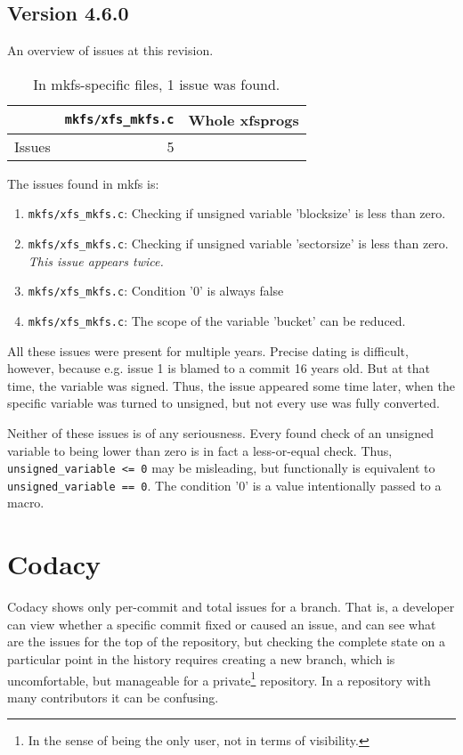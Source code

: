 \subsection{Version 4.6.0}
An overview of issues at this revision.
\begin{table}[h]
\begin{tabular}{|l||r||r|}
\hline
& {\tt mkfs/xfs\_mkfs.c} & Whole xfsprogs \\
\hline
Issues & 5 &  \\
\hline
\end{tabular}
\caption{In mkfs-specific files, 1 issue was found.}
\end{table}

The issues found in mkfs is:
\begin{enumerate}
	\item {\tt mkfs/xfs\_mkfs.c}: Checking if unsigned variable 'blocksize' is less than zero.
	\item {\tt mkfs/xfs\_mkfs.c}: Checking if unsigned variable
		'sectorsize' is less than zero. {\em This issue appears
		twice.}
	\item {\tt mkfs/xfs\_mkfs.c}: Condition '0' is always false
	\item {\tt mkfs/xfs\_mkfs.c}: The scope of the variable 'bucket' can be reduced.
\end{enumerate}

All these issues were present for multiple years. Precise dating is
difficult, however, because e.g. issue 1 is blamed to a commit 16 years
old. But at that time, the variable was signed. Thus, the issue appeared
some time later, when the specific variable was turned to unsigned, but not
every use was fully converted.

Neither of these issues is of any seriousness. Every found check of an
unsigned variable to being lower than zero is in fact a less-or-equal
check. Thus, {\tt unsigned\_variable <= 0} may be misleading, but
functionally is equivalent to {\tt unsigned\_variable == 0}.
The condition '0' is a value intentionally passed to a macro.


\section{Codacy}\label{chap:results:codacy}
Codacy shows only per-commit and total issues for a branch. That is, a
developer can view whether a specific commit fixed or caused an issue, and
can see what are the issues for the top of the repository, but checking the
complete state on a particular point in the history requires creating a new
branch, which is uncomfortable, but manageable for a private\footnote{In
the sense of being the only user, not in terms of visibility.} repository.
In a repository with many contributors it can be confusing.

